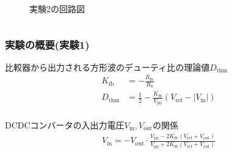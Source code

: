 \documentclass[mathsans]{beamer} %
\begin{document}
\begin{frame}
\begin{columns}
\begin{column}{.45\linewidth}
\begin{figure}[htbp]
\begin{center}
					\caption{実験2の回路図}\label{fig:DCDC_add_comp}
				\end{center}
			\end{figure}
		\end{column}
	\end{columns}
\end{frame}
\begin{frame}
	\frametitle{実験の概要(実験1)}
	比較器から出力される方形波のデューティ比の理論値$D_\mathrm{thm}$
	\begin{align}
		K_\mathrm{fb}  & = -\frac{R_\mathrm{fb}}{R_0}                                                        \\
		D_\mathrm{thm} & = \frac{1}{2} - \frac{K_\mathrm{fb}}{V_\mathrm{pp}}(V_\mathrm{ref}-|V_\mathrm{in}|)
	\end{align}
	\hrulefill\\
	DCDCコンバータの入出力電圧$V_\mathrm{in},V_\mathrm{out}$の関係
	\begin{align}
		V_\mathrm{in} = - V_\mathrm{out} \cdot\frac{V_\mathrm{pp}-2K_\mathrm{fb}(V_\mathrm{ref}+V_\mathrm{out})}{V_\mathrm{pp}+2K_\mathrm{fb}(V_\mathrm{ref}+V_\mathrm{out})}
	\end{align}
\end{frame}
\end{document}
